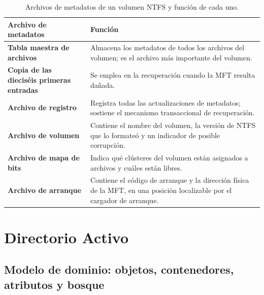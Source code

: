\documentclass[12pt]{article}
\begin{document}
\begin{table}[H]
\centering
\small
\renewcommand{\arraystretch}{1.15}
\renewcommand{\tabularxcolumn}[1]{m{#1}}
\setlength{\emergencystretch}{1.5em}
\caption{Archivos de metadatos de un volumen NTFS y función de cada uno.}
\label{tab:archivosMetaNtfs}
\begin{tabularx}{\textwidth}{>{\centering\arraybackslash}m{4.6cm} X}
\toprule
\textbf{Archivo de metadatos} & \textbf{Función} \\
\midrule
\textbf{Tabla maestra de archivos} & Almacena los metadatos de todos los archivos del volumen; es el archivo más importante del volumen. \\
\addlinespace
\textbf{Copia de las dieciséis primeras entradas} & Se emplea en la recuperación cuando la MFT resulta dañada. \\
\addlinespace
\textbf{Archivo de registro} & Registra todas las actualizaciones de metadatos; sostiene el mecanismo transaccional de recuperación. \\
\addlinespace
\textbf{Archivo de volumen} & Contiene el nombre del volumen, la versión de NTFS que lo formateó y un indicador de posible corrupción. \\
\addlinespace
\textbf{Archivo de mapa de bits} & Indica qué clústeres del volumen están asignados a archivos y cuáles están libres. \\
\addlinespace
\textbf{Archivo de arranque} & Contiene el código de arranque y la dirección física de la MFT, en una posición localizable por el cargador de arranque. \\
\bottomrule
\end{tabularx}
\end{table}

\section{Directorio Activo}
\label{sec:directorioActivo}

\subsection{Modelo de dominio: objetos, contenedores, atributos y bosque}
\label{sec:modeloDominio}
\end{document}
